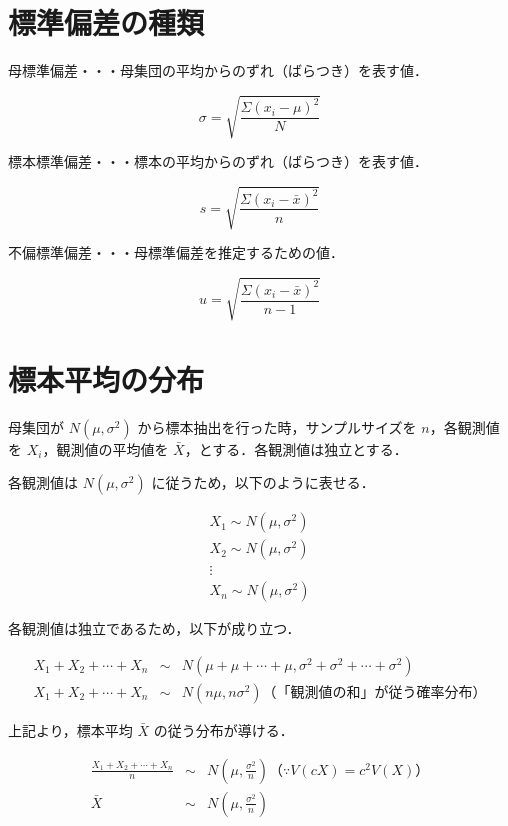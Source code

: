 \section{標準偏差の種類}

母標準偏差・・・母集団の平均からのずれ（ばらつき）を表す値．

\[
  \sigma = \sqrt{\frac{\Sigma(x_i - \mu)^2}{N}}
\]

標本標準偏差・・・標本の平均からのずれ（ばらつき）を表す値．

\[
  s = \sqrt{\frac{\Sigma(x_i - \bar{x})^2}{n}}
\]

不偏標準偏差・・・母標準偏差を推定するための値．

\[
  u = \sqrt{\frac{\Sigma(x_i - \bar{x})^2}{n-1}}
\]

\section{標本平均の分布}

母集団が $N(\mu, \sigma^2)$ から標本抽出を行った時，サンプルサイズを $n$，各観測値を $X_i$，観測値の平均値を $\bar{X}$，とする．各観測値は独立とする．

各観測値は $N(\mu, \sigma^2)$ に従うため，以下のように表せる．

\begin{eqnarray}
  X_1 \sim N(\mu, \sigma^2)\\
  X_2 \sim N(\mu, \sigma^2)\\
  \vdots\\
  X_n \sim N(\mu, \sigma^2)
\end{eqnarray}

各観測値は独立であるため，以下が成り立つ．

\begin{eqnarray}
  X_1 + X_2 + \cdots + X_n & \sim & N(\mu + \mu + \cdots + \mu, \sigma^2 + \sigma^2 + \cdots + \sigma^2)\\
  X_1 + X_2 + \cdots + X_n & \sim & N(n\mu, n\sigma^2)（「観測値の和」が従う確率分布）
\end{eqnarray}

上記より，標本平均 $\bar{X}$ の従う分布が導ける．

\begin{eqnarray}
  \frac{X_1 + X_2 + \cdots + X_n}{n} & \sim & N(\mu, \frac{\sigma^2}{n})（\because V(c X) = c^2 V(X)）\\
  \bar{X} & \sim & N(\mu, \frac{\sigma^2}{n})
\end{eqnarray}

